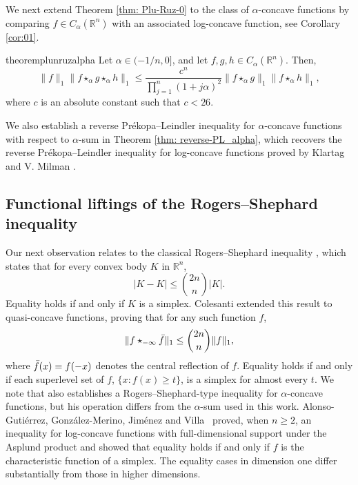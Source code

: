 \documentclass[11pt]{amsart}
\newcommand{\R}{{\mathbb R}}
\theoremstyle{plain}
\theoremstyle{definition}
\theoremstyle{remark}
\begin{document}
We next extend Theorem \ref{thm: Plu-Ruz-0} to the class of $\alpha$-concave functions by comparing $f \in C_\alpha(\R^n)$ with an associated log-concave function, see Corollary \ref{cor:01}.

\begin{restatable}{theorem}{plunruzalpha}
\label{thm: Plu-Ruz-alpha}
Let $\alpha \in (-1/n,0]$, and let $f,g,h \in C_\alpha (\R^n) $. Then,
    \[
        \|f\|_1 \| f \star_\alpha g \star_\alpha h \|_1 \leq \frac{c^n}{\prod_{j=1}^n(1+j \alpha)^2}\| f \star_\alpha g \|_1 \| f \star_\alpha h \|_1,
    \]
    where $c$ is an absolute constant such that $c <26$.
\end{restatable}

We also establish a reverse Pr\'ekopa--Leindler inequality for $\alpha$-concave functions with respect to $\alpha$-sum in Theorem \ref{thm: reverse-PL_alpha}, which recovers the reverse Pr\'ekopa--Leindler inequality for log-concave functions proved by Klartag and V. Milman \cite{KM-05}.

\subsection{Functional liftings of the Rogers--Shephard inequality}

Our next observation relates to the classical Rogers--Shephard inequality \cite{RS-57}, which states that for every convex body $K$ in $\R^n$,
\begin{equation}
    \label{eq:RS-bodies}
    |K-K| \leq \binom{2n}{n} |K|.
\end{equation}
Equality holds if and only if $K$ is a simplex.
Colesanti \cite{C-06} extended this result to quasi-concave functions, proving that for any such function $f$,
\begin{equation}
    \| f \star_{-\infty} \Bar{f}\|_1 \leq \binom{2n}{n} \|f\|_1,
\end{equation}
where $\Bar{f} (x) = f(-x)$ denotes the central reflection of $f$. Equality holds if and only if each superlevel set of  $f$, $\{x : f(x) \geq t \}$, is a simplex for almost every $t$. We note that \cite{C-06} also establishes a Rogers--Shephard-type inequality for $\alpha$-concave functions, but his operation differs from the $\alpha$-sum used in this work. Alonso-Guti\'errez, Gonz\'alez-Merino, Jim\'enez and Villa~\cite{AGJV-16} proved, when $n\geq 2$, an inequality for log-concave functions with full-dimensional support under the Asplund product and showed that equality holds if and only if  $f$ is the characteristic function of a simplex.
The equality cases in dimension one differ substantially from those in higher dimensions.
\end{document}
